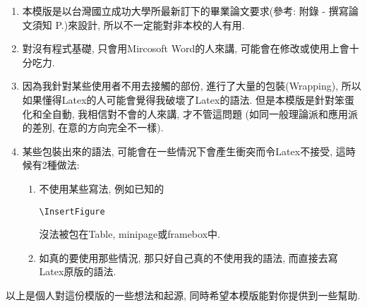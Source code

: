 \begin{enumerate}

  \item
  {
    本模版是以台灣國立成功大學所最新訂下的畢業論文要求(參考: 附錄 - 撰寫論文須知 P.)來設計, 所以不一定能對非本校的人有用.
  } %

  \item
  {
    對沒有程式基礎, 只會用Mircosoft Word的人來講, 可能會在修改或使用上會十分吃力.
  } %

  \item
  {
    因為我針對某些使用者不用去接觸的部份, 進行了大量的包裝(Wrapping), 所以如果懂得Latex的人可能會覺得我破壞了Latex的語法. 但是本模版是針對笨蛋化和全自動, 我相信對不會的人來講, 才不管這問題 (如同一般理論派和應用派的差別, 在意的方向完全不一樣).
  } %

  \item
  {
    某些包裝出來的語法, 可能會在一些情況下會產生衝突而令Latex不接受, 這時候有2種做法:
    \begin{enumerate}
      \item
      {
        不使用某些寫法, 例如已知的\begin{verbatim}\InsertFigure\end{verbatim}沒法被包在Table, minipage或framebox中.
      } %

      \item
      {
        如真的要使用那些情況, 那只好自己真的不使用我的語法, 而直接去寫Latex原版的語法.
      } %
    \end{enumerate}
  } %
\end{enumerate}



以上是個人對這份模版的一些想法和起源, 同時希望本模版能對你提供到一些幫助.

\EndChapter
